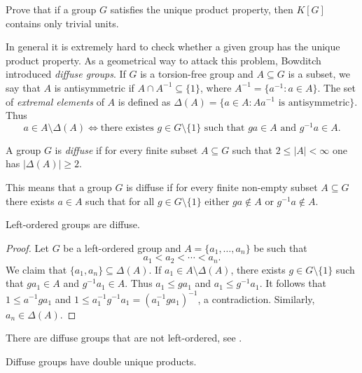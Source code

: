 \begin{exercise}
	Prove that if a group $G$ satisfies the unique product property, then 
    $K[G]$ contains only trivial units.
\end{exercise}

In general it is extremely hard to check whether a given group
has the unique product property. As a geometrical way to 
attack this problem, Bowditch introduced \emph{diffuse groups}. If
$G$ is a torsion-free group and 
$A\subseteq G$ is a subset, we say that $A$ is antisymmetric 
if $A\cap A^{-1}\subseteq\{1\}$, where $A^{-1}=\{a^{-1}:a\in
A\}$. The set of \emph{extremal elements} of $A$ is defined as 
$\Delta(A)=\{a\in A:Aa^{-1}\text{ is antisymmetric}\}$. 
Thus 
\[
	a\in A\setminus\Delta(A)
	\Longleftrightarrow
	\text{there existes $g\in G\setminus\{1\}$ such that $ga\in A$ and $g^{-1}a\in A$}.
\]

\begin{definition}
	A group $G$ is \emph{diffuse} if for every finite subset $A\subseteq
	G$ such that $2\leq |A|<\infty$ one has $|\Delta(A)|\geq2$.
\end{definition}

This means that a group $G$ is diffuse if for every finite non-empty subset $A\subseteq G$ there exists 
$a\in A$ such that for all $g\in G\setminus\{1\}$ either $ga\not\in A$ or $g^{-1}a\not\in A$. 

\begin{proposition}
	Left-ordered groups are diffuse.	
\end{proposition}

\begin{proof}
    Let $G$ be a left-ordered group and $A=\{a_1,\dots,a_n\}$ be such that
    \[
    a_1<a_2<\cdots<a_n.
    \]
    We claim that 
	$\{a_1,a_n\}\subseteq\Delta(A)$. If $a_1\in
	A\setminus\Delta(A)$, there exists $g\in G\setminus\{1\}$ such that $ga_1\in A$ and
	$g^{-1}a_1\in A$. Thus  $a_1\leq ga_1$ and $a_1\leq g^{-1}a_1$. It follows that
	$1\leq a^{-1}ga_1$ and $1\leq a_1^{-1}g^{-1}a_1=(a_1^{-1}ga_1)^{-1}$, 
	a contradiction. Similarly, $a_n\in \Delta(A)$.
\end{proof}

There are diffuse groups that are not left-ordered, see
\cite{MR3548136}. 

\begin{proposition}
	\label{pro:difuso=>2up}
    Diffuse groups have double unique products.  
\end{proposition}

